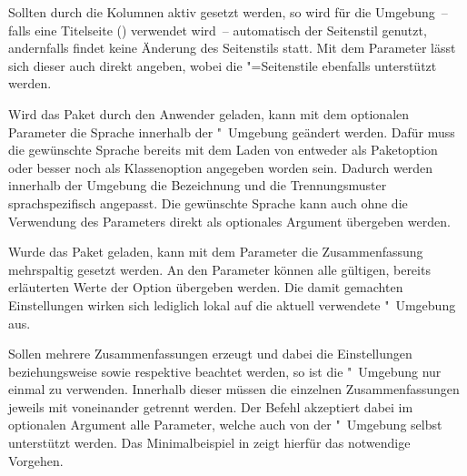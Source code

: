 \begin{DeclareEntity*}{}
\begin{DeclareEntity*}{}
\begin{DeclareEntity*}{}
\begin{Declaration}
\begin{Declaration}
\begin{Declaration}
\begin{Declaration}
\begin{Declaration}
\begin{Declaration}
\begin{Declaration}
Sollten durch  die Kolumnen aktiv gesetzt werden,
so wird für die Umgebung~-- falls eine Titelseite () 
verwendet wird~-- automatisch der Seitenstil  genutzt, 
andernfalls findet keine Änderung des Seitenstils statt. Mit dem Parameter 
 lässt sich dieser auch direkt angeben, wobei 
die "=Seitenstile ebenfalls unterstützt werden.

Wird das Paket  durch den Anwender geladen, kann mit dem 
optionalen Parameter  die Sprache 
innerhalb der "~Umgebung geändert werden. Dafür muss die 
gewünschte Sprache bereits mit dem Laden von  entweder als 
Paketoption oder besser noch als Klassenoption angegeben worden sein. Dadurch 
werden innerhalb der Umgebung die Bezeichnung  und die 
Trennungsmuster sprachspezifisch angepasst. Die gewünschte Sprache kann auch 
ohne die Verwendung des Parameters  direkt als 
optionales Argument übergeben werden.

Wurde das Paket  geladen, kann mit dem Parameter 
 die Zusammenfassung mehrspaltig 
gesetzt werden. An den Parameter  können alle 
gültigen, bereits erläuterten Werte der Option  übergeben 
werden. Die damit gemachten Einstellungen wirken sich lediglich lokal auf die 
aktuell verwendete "~Umgebung aus.

%
Sollen mehrere Zusammenfassungen erzeugt und dabei die Einstellungen 
 beziehungsweise  sowie 
 respektive  beachtet werden, so 
ist die "~Umgebung nur einmal zu verwenden. Innerhalb 
dieser müssen die einzelnen Zusammenfassungen jeweils mit  
voneinander getrennt werden. Der Befehl akzeptiert dabei im optionalen Argument 
alle Parameter, welche auch von der "~Umgebung selbst 
unterstützt werden. Das Minimalbeispiel in  
zeigt hierfür das notwendige Vorgehen.
\end{Declaration}
\end{Declaration}
\end{Declaration}
\end{Declaration}
\end{Declaration}
\end{Declaration}
\end{Declaration}


\end{DeclareEntity*}
\end{DeclareEntity*}
\end{DeclareEntity*}

